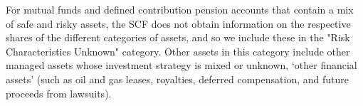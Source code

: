 

For mutual funds and defined contribution pension accounts that contain a 
mix of safe and risky assets, the SCF does not obtain information on the 
respective shares of the different categories of assets, and so we include 
these in the "Risk Characteristics Unknown" category.  Other assets in this 
category include other managed assets whose investment strategy 
is mixed or unknown, `other financial assets' (such as oil and gas leases,
royalties, deferred compensation, and future proceeds from lawsuits).



